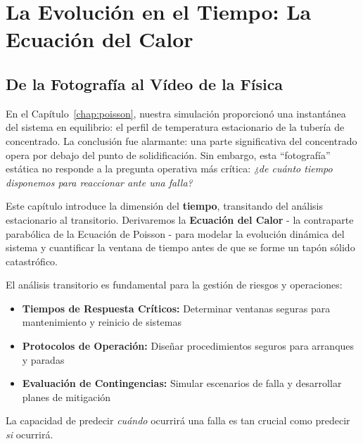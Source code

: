 \chapter{La Evolución en el Tiempo: La Ecuación del Calor}
\label{chap:heat}

\section{De la Fotografía al Vídeo de la Física}
\label{sec:heat-intro}

En el Capítulo~\ref{chap:poisson}, nuestra simulación proporcionó una instantánea del sistema en equilibrio: el perfil de temperatura estacionario de la tubería de concentrado. La conclusión fue alarmante: una parte significativa del concentrado opera por debajo del punto de solidificación. Sin embargo, esta ``fotografía'' estática no responde a la pregunta operativa más crítica: \textit{¿de cuánto tiempo disponemos para reaccionar ante una falla?}

Este capítulo introduce la dimensión del \textbf{tiempo}, transitando del análisis estacionario al transitorio. Derivaremos la \textbf{Ecuación del Calor} - la contraparte parabólica de la Ecuación de Poisson - para modelar la evolución dinámica del sistema y cuantificar la ventana de tiempo antes de que se forme un tapón sólido catastrófico.


\begin{center}
\begin{tcolorbox}[colback=blue!5!white,colframe=blue!75!black,title=CONTEXTO INGENIERIL,fonttitle=\bfseries]
El análisis transitorio es fundamental para la gestión de riesgos y operaciones:
\begin{itemize}
    \item \textbf{Tiempos de Respuesta Críticos:} Determinar ventanas seguras para mantenimiento y reinicio de sistemas
    \item \textbf{Protocolos de Operación:} Diseñar procedimientos seguros para arranques y paradas
    \item \textbf{Evaluación de Contingencias:} Simular escenarios de falla y desarrollar planes de mitigación
\end{itemize}
La capacidad de predecir \textit{cuándo} ocurrirá una falla es tan crucial como predecir \textit{si} ocurrirá.
\end{tcolorbox}
\end{center}


